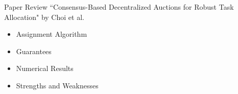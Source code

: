 \begin{frame}{Paper Review}
    ``Consensus-Based Decentralized Auctions for Robust Task Allocation" by  Choi et al. \cite{choi2009consensus}
    \begin{itemize}
        \item Assignment Algorithm
        \item Guarantees
        \item Numerical Results
        \item Strengths and Weaknesses 
    \end{itemize}
\end{frame}


